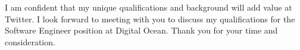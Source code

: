 \documentclass[11pt, a4paper]{awesome-cv}
\begin{document}
\begin{cvletter}
    I am confident that my unique qualifications and background will add value at Twitter. I look forward to meeting with you to discuss my qualifications for the Software Engineer position at Digital Ocean. Thank you for your time and consideration.\\
    

\end{cvletter}

\makeletterclosing
\end{document}
